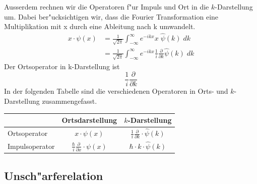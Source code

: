 \begin{refsection}
\begin{equation}
\end{equation}
Ausserdem rechnen wir die Operatoren f"ur Impuls und Ort in die $k$-Darstellung um.
Dabei ber"ucksichtigen wir, dass die Fourier Transformation eine Multiplikation mit x durch eine Ableitung nach k umwandelt.
\begin{align}
x\cdot\psi(x) &= \frac{1}{\sqrt{2\pi }} \int_{-\infty}^{\infty} e^{-ikx} x \;\hat{\psi}(k) \; dk\\
&= \frac{1}{\sqrt{2\pi }} \int_{-\infty}^{\infty} e^{-ikx} \frac{1}{i}\frac{\partial}{\partial k} \hat{\psi}(k) \; dk
\end{align}
Der Ortsoperator in k-Darstellung ist 
\begin{equation}
\frac{1}{i}\frac{\partial}{\partial k}
\end{equation}
In der folgenden Tabelle sind die verschiedenen Operatoren in Orts- und $k$-Darstellung zusammengefasst.
\begin{center}
\renewcommand{\arraystretch}{1.25}
\begin{tabular}{|l|c|c|}
\hline
& Ortsdarstellung & $k$-Darstellung\\
\hline
Ortsoperator & $x \cdot \psi(x) $ & $\frac{1}{i}\frac{\partial}{\partial k} \cdot \hat{\psi}(k)$\\
 \hline
Impulsoperator & $\frac{\hbar}{i}\frac{\partial}{\partial x} \cdot \psi(x)$ & $\hbar \cdot k \cdot \hat{\psi}(k)$\\
\hline
\end{tabular}
\renewcommand{\arraystretch}{1}
\end{center}

\subsection{Unsch"arferelation}


\end{refsection}
